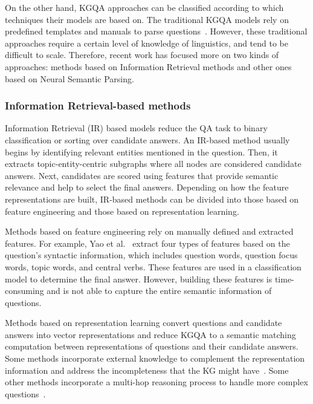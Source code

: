 On the other hand, KGQA approaches can be classified according to which techniques their models 
are based on. The traditional KGQA models rely on predefined templates and manuals to parse 
questions~\cite{qa:core-techniques-DiefenbachLSM18}. However, these traditional approaches require 
a certain level of knowledge of linguistics, and tend to be difficult to scale. Therefore, recent 
work has focused more on two kinds of approaches: methods based on Information Retrieval methods 
and other ones based on Neural Semantic Parsing.

\subsubsection{Information Retrieval-based methods}
\label{cap2:theoFrame/qakg/approaches/infRetrieval}
Information Retrieval (IR) based models reduce the QA task to binary classification or sorting 
over candidate answers. An IR-based method usually begins by identifying relevant entities 
mentioned in the question. Then, it extracts topic-entity-centric subgraphs where all nodes are 
considered candidate answers. Next, candidates are scored using features that provide semantic 
relevance and help to select the final answers. Depending on how the feature representations 
are built, IR-based methods can be divided into those based on feature engineering and those 
based on representation learning.

Methods based on feature engineering rely on manually defined and extracted features. For 
example, Yao et al.~\cite{qa:YaoD14} extract four types of features based on the question’s 
syntactic information, which includes question words, question focus words, topic words, and 
central verbs. These features are used in a classification model to determine the final answer. 
However, building these features is time-consuming and is not able to capture the entire 
semantic information of questions.

Methods based on representation learning convert questions and candidate answers into vector 
representations and reduce KGQA to a semantic matching computation between representations of 
questions and their candidate answers. Some methods incorporate external knowledge to complement 
the representation information and address the incompleteness that the KG might 
have~\cite{qa:XuRFHZ16,qa:SunDZMSC18,qa:TrouillonWRGB16}. Some other methods incorporate a 
multi-hop reasoning process to handle more complex questions~\cite{qa:SukhbaatarSWF15,qa:MillerFDKBW16,qa:QiuWJZ20}.

